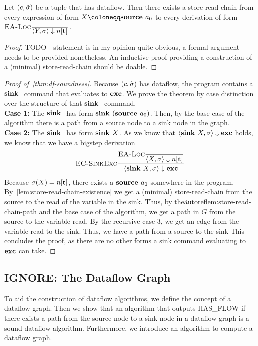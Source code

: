 \begin{lemma}
    Let $(c, \tilde{\sigma}{})$ be a tuple that has dataflow.
    Then there exists a store-read-chain 
    from every expression of form $X \coloneqq \source{a_0}$ to every 
    derivation of form $\bsrule{EA-Loc}{}{\bigstep{Y}{\sigma}{\tracked{}}}$.
    \label{lem:store-read-chain-existence}
\end{lemma}
\begin{proof}
    TODO - statement is in my opinion quite obvious, a formal argument needs to be provided nonetheless.
    An inductive proof providing a construction of a (minimal) store-read-chain should be doable.
\end{proof}
    
\begin{proof}[Proof of~\autoref{thm:df-soundness}]
    Because $(c, \tilde{\sigma}{})$ has dataflow, the program contains a $\textbf{sink }{}$
    command that evaluates to $\textbf{exc}$.
    We prove the theorem by case distinction over the structure of that $\textbf{sink }{}$
    command.\\
    \textbf{Case 1:}
    The $\textbf{sink }{}$ has form $\textbf{sink }{(\textbf{source }{ a_0})}$.
    Then, by the base case of the algorithm there is a path from a source node
    to a sink node in the graph.\\
    \textbf{Case 2:}
    The $\textbf{sink }{}$ has form $\textbf{sink }{X}$.
    As we know that $\langle \textbf{sink }{X}, \sigma \rangle \downarrow \textbf{exc}$ holds, we know that
    we have a bigstep derivation
    \begin{align*}
        \bsrule{EC-SinkExc}
        {\bsrule{EA-Loc}{}{\bigstep{X}{\sigma}{\tracked{}}}}
        {\bigstep{\sink{X}}{\sigma}{\exception}}
    \end{align*}
    Because $\sigma(X) = \tracked{}$, there exists a $\textbf{source }{a_0}$ somewhere in the program.
    By~\autoref{lem:store-read-chain-existence} we get a (minimal) store-read-chain from the source 
    to the read of the variable in the sink.
    Thus, by the\~autoref{lem:store-read-chain-path} and the base case of the algorithm, 
    we get a path in $G$ from the source to the variable read.
    By the recursive case 3, we get an edge from the variable read to the sink.
    Thus, we have a path from a source to the sink
    This concludes the proof, as there are no other forms a sink command evaluating 
    to $\textbf{exc}$ can take.
\end{proof}
\iffalse
\subsection{IGNORE: The Dataflow Graph}
To aid the construction of dataflow algorithms, we define the concept
of a dataflow graph.
Then we show that an algorithm that outputs HAS\_FLOW if 
there exists a path from the source 
node to a sink node in a dataflow graph %
is a sound dataflow algorithm.
Furthermore, we introduce an algorithm to compute a dataflow graph.

